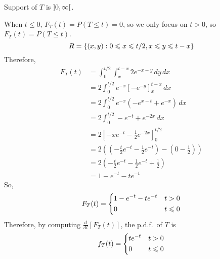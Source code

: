 \begin{Example}{}{}
\begin{enumerate}[label=(\roman*)]
              Support of $ T $ is $ \interval[open]{0}{\infty} $.

              When $ t\leqslant 0 $, $ F_T(t)=P(T\leqslant t)=0 $,
              so we only focus on $ t>0 $, so $ F_T(t)=P(T\leqslant t) $.
              \[ R=\{(x,y):0\leqslant x\leqslant t/2, x\leqslant y\leqslant t-x\} \]
              Therefore,
              \begin{align*}
                  F_T(t)
                   & = \int_{0}^{t/2} \int_{x}^{t-x} 2e^{-x-y}\, d{y} \, d{x}             \\
                   & =2 \int_{0}^{t/2} e^{-x}\left[ -e^{-y} \right]_x^{t-x}\, d{x}        \\
                   & =2 \int_{0}^{t/2} e^{-x}\left( -e^{x-t}+e^{-x} \right)\, d{x}        \\
                   & =2 \int_{0}^{t/2} -e^{-t}+e^{-2x}\, d{x}                             \\
                   & =2\left[ -xe^{-t}-\frac{1}{2}e^{-2x} \right]_0^{t/2}                 \\
                   & =2\left( \left( -\frac{t}{2} e^{-t} -\frac{1}{2} e^{-t}\right)
                  -\left( 0-\frac{1}{2}  \right) \right)                                  \\
                   & =2\left( -\frac{t}{2} e^{-t}-\frac{1}{2} e^{-t}+\frac{1}{2}  \right) \\
                   & =1-e^{-t}-te^{-t}
              \end{align*}
              So,
              \[ F_T(t)=
                  \begin{dcases}
                      1-e^{-t}-te^{-t} & t>0          \\
                      0                & t\leqslant 0
                  \end{dcases} \]
              Therefore, by computing $ \displaystyle
                  \frac{d}{dt}[F_T(t)] $, the p.d.f.\ of $ T $ is
              \[ f_T(t)=
                  \begin{dcases}
                      te^{-t} & t> 0         \\
                      0       & t\leqslant 0
                  \end{dcases} \]
    \end{enumerate}
\end{Example}
